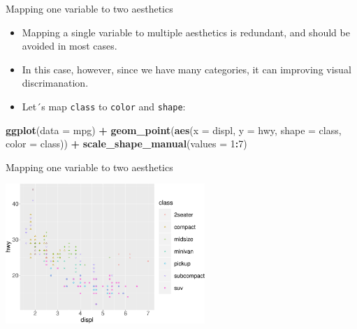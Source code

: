 \documentclass[ignorenonframetext,]{beamer}
\newenvironment{Shaded}{\begin{snugshade}}{\end{snugshade}}
\newcommand{\DataTypeTok}[1]{\textcolor[rgb]{0.13,0.29,0.53}{#1}}
\newcommand{\DecValTok}[1]{\textcolor[rgb]{0.00,0.00,0.81}{#1}}
\newcommand{\KeywordTok}[1]{\textcolor[rgb]{0.13,0.29,0.53}{\textbf{#1}}}
\newcommand{\NormalTok}[1]{#1}
\newcommand{\OperatorTok}[1]{\textcolor[rgb]{0.81,0.36,0.00}{\textbf{#1}}}
\newcommand{\StringTok}[1]{\textcolor[rgb]{0.31,0.60,0.02}{#1}}
\begin{document}
\begin{frame}[fragile]{Mapping one variable to two aesthetics}
\protect\hypertarget{mapping-one-variable-to-two-aesthetics}{}

\begin{itemize}
\item
  Mapping a single variable to multiple aesthetics is redundant, and
  should be avoided in most cases.
\item
  In this case, however, since we have many categories, it can improving
  visual discrimanation.
\item
  Let´s map \texttt{class} to \texttt{color} and \texttt{shape}:
\end{itemize}

\begin{Shaded}
\begin{Highlighting}[]
\KeywordTok{ggplot}\NormalTok{(}\DataTypeTok{data =}\NormalTok{ mpg) }\OperatorTok{+}
\StringTok{  }\KeywordTok{geom_point}\NormalTok{(}\KeywordTok{aes}\NormalTok{(}\DataTypeTok{x =}\NormalTok{ displ, }\DataTypeTok{y =}\NormalTok{ hwy, }
                 \DataTypeTok{shape =}\NormalTok{ class, }\DataTypeTok{color =}\NormalTok{ class)) }\OperatorTok{+}
\StringTok{  }\KeywordTok{scale_shape_manual}\NormalTok{(}\DataTypeTok{values =} \DecValTok{1}\OperatorTok{:}\DecValTok{7}\NormalTok{)}
\end{Highlighting}
\end{Shaded}

\end{frame}

\begin{frame}{Mapping one variable to two aesthetics}
\protect\hypertarget{mapping-one-variable-to-two-aesthetics-1}{}

\begin{center}\includegraphics[height=200px]{data-visualization_files/figure-beamer/unnamed-chunk-20-1} \end{center}

\end{frame}
\end{document}
